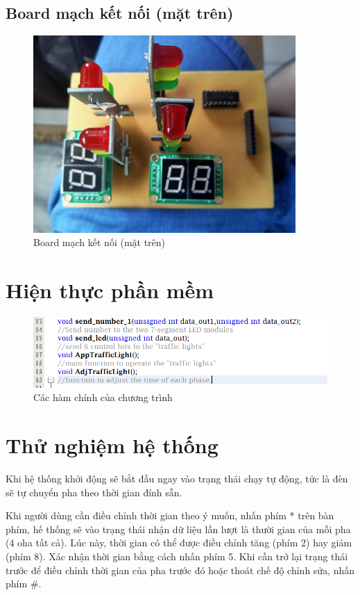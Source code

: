 \documentclass[a4paper]{article}
\begin{document}
\subsection{Board mạch kết nối (mặt trên)}
\begin{figure}[H]
\begin{center}

\includegraphics[width=10cm,angle=90]{pic7.jpg}
\caption{Board mạch kết nối (mặt trên)}
\end{center}
\end{figure}
\section{Hiện thực phần mềm}
\begin{figure}[H]
\begin{center}
\includegraphics[width=12cm]{pic7.png}
\caption{Các hàm chính của chương trình}
\end{center}
\end{figure}
\section{Thử nghiệm hệ thống}

Khi hệ thống khởi động sẽ bắt đầu ngay vào trạng thái chạy tự động, tức là đèn sẽ tự chuyển pha theo thời gian đính sẵn.

Khi người dùng cần điều chỉnh thời gian theo ý muốn, nhấn phím * trên bàn phím, hế thống sẽ vào trạng thái nhận dữ liệu lần lượt là thười gian của mỗi pha (4 oha tất cả). Lúc này, thời gian có thể được điều chỉnh tăng (phím 2) hay giảm (phím 8). Xác nhận thời gian bằng cách nhấn phím 5. Khi cần trở lại trạng thái trước để điều chỉnh thời gian của pha trước đó hoặc thoát chế độ chỉnh sửa, nhấn phím \#.
\end{document}
